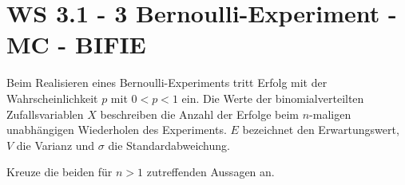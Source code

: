 \section{WS 3.1 - 3 Bernoulli-Experiment - MC - BIFIE}

\begin{beispiel}[WS 3.1]{1} %
Beim Realisieren eines Bernoulli-Experiments tritt Erfolg mit der Wahrscheinlichkeit $p$ mit
$0 < p < 1$ ein. Die Werte der binomialverteilten Zufallsvariablen $X$ beschreiben die Anzahl der
Erfolge beim $n$-maligen unabhängigen Wiederholen des Experiments. $E$ bezeichnet den Erwartungswert,
$V$ die Varianz und $\sigma$ die Standardabweichung.\leer

Kreuze die beiden für $n>1$ zutreffenden Aussagen an.

\end{beispiel} 